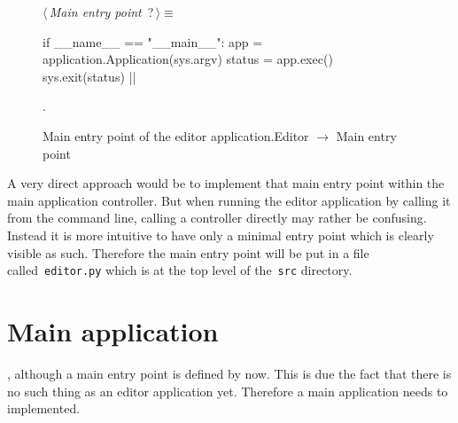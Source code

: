 \documentclass[%
    a4paper,    %
    justified,  %
    nobib,      %
    openany     %
]{tufte-book}
\begin{document}
\begin{figure}[h]
  \begin{flushleft} \small
\begin{minipage}{\linewidth}\label{scrap11}\raggedright\small
{} $\langle\,${\itshape Main entry point}\nobreak\ {\footnotesize {?}}$\,\rangle\equiv$
\vspace{-1ex}
\begin{pythoncode}
if __name__ == "__main__":
    app = application.Application(sys.argv)
    status = app.exec()
    sys.exit(status)
  |\NWsep|
\end{pythoncode}
\vspace{1.5ex}
\footnotesize
\begin{list}{}{\setlength{\itemsep}{-\parsep}\setlength{\itemindent}{-\leftmargin}}
\item {\NWtxtMacroNoRef}.

\item{}
\end{list}
\end{minipage}\vspace{4ex}
\end{flushleft}
\caption{Main entry point of the editor application.\newline{}\newline{}Editor
    $\rightarrow$ Main entry point}
  \label{editor:lst:main}
\end{figure}

 A very direct approach
would be to implement that main entry point within the main application
controller. But when running the editor application by calling it from the
command line, calling a controller directly may rather be confusing. Instead it
is more intuitive to have only a minimal entry point which is clearly visible as
such. Therefore the main entry point will be put in a file
called~\verb+editor.py+ which is at the top level of the~\verb+src+ directory.

\section{Main application}
\label{appendix:sec:editor:app}

, although a main entry
point is defined by now. This is due the fact that there is no such thing as an
editor application yet. Therefore a main application needs to implemented.
\end{document}
